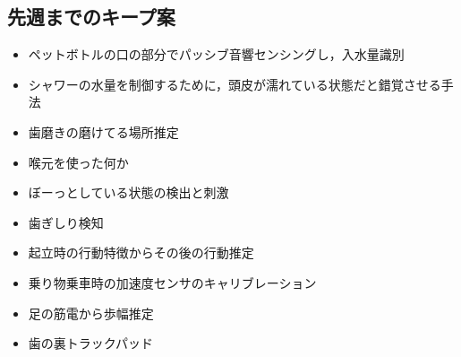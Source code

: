 \documentclass[a4j,10pt]{jarticle}
\begin{document}


\begin{multicols}{2}

  \section{先週までのキープ案}
  \begin{itemize}
    \item ペットボトルの口の部分でパッシブ音響センシングし，入水量識別
    \item シャワーの水量を制御するために，頭皮が濡れている状態だと錯覚させる手法
    \item 歯磨きの磨けてる場所推定
    \item 喉元を使った何か
    \item ぼーっとしている状態の検出と刺激
    \item 歯ぎしり検知
    \item 起立時の行動特徴からその後の行動推定
    \item 乗り物乗車時の加速度センサのキャリブレーション
    \item 足の筋電から歩幅推定
    \item 歯の裏トラックパッド
  \end{itemize}



\end{multicols}
\end{document}
